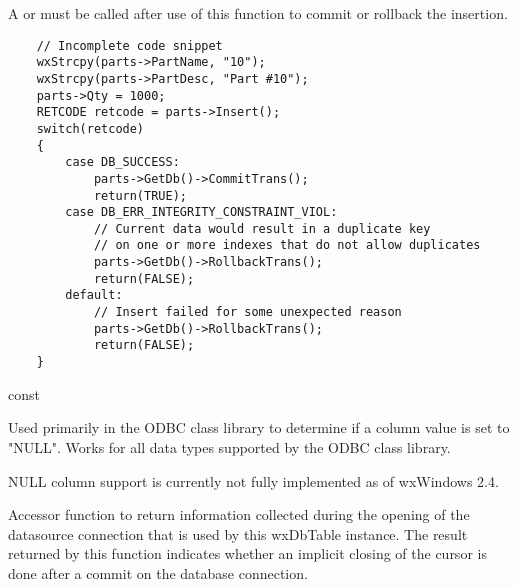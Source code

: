 
A  or
 must be called after use of
this function to commit or rollback the insertion.


\begin{verbatim}
    // Incomplete code snippet
    wxStrcpy(parts->PartName, "10");
    wxStrcpy(parts->PartDesc, "Part #10");
    parts->Qty = 1000;
    RETCODE retcode = parts->Insert();
    switch(retcode)
    {
        case DB_SUCCESS:
            parts->GetDb()->CommitTrans();
            return(TRUE);
        case DB_ERR_INTEGRITY_CONSTRAINT_VIOL:
            // Current data would result in a duplicate key
            // on one or more indexes that do not allow duplicates
            parts->GetDb()->RollbackTrans();
            return(FALSE);
        default:
            // Insert failed for some unexpected reason
            parts->GetDb()->RollbackTrans();
            return(FALSE);
    }
\end{verbatim}

\label{wxdbtableiscolnull}

 const

Used primarily in the ODBC class library to determine if a column value is
set to "NULL".  Works for all data types supported by the ODBC class library.




NULL column support is currently not fully implemented as of wxWindows 2.4.

\label{wxdbtableiscursorclosedoncommit}


Accessor function to return information collected during the opening of the
datasource connection that is used by this wxDbTable instance.  The result
returned by this function indicates whether an implicit closing of the cursor is
done after a commit on the database connection.


